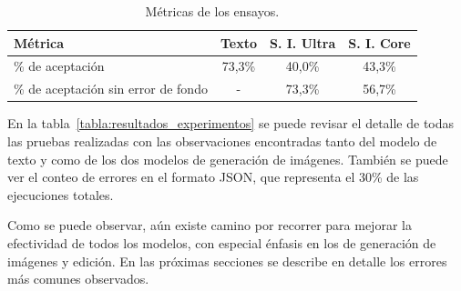 \begin{table}[ht]
	\centering
	\caption{Métricas de los ensayos.}
	\begin{tabular}{l c c c}    
		\toprule
		\textbf{Métrica} & \textbf{Texto} & \textbf{S. I. Ultra} & \textbf{S. I. Core} \\
		\midrule
		\% de aceptación & 73,3\% & 40,0\% & 43,3\% \\
            \% de aceptación sin error de fondo & - & 73,3\% & 56,7\% \\
		\bottomrule
		\hline
	\end{tabular}
	\label{tab:metricas_experimentos}
\end{table}

En la tabla~\ref{tabla:resultados_experimentos} se puede revisar el detalle de todas las pruebas realizadas con las observaciones encontradas tanto del modelo de texto y como de los dos modelos de generación de imágenes. También se puede ver el conteo de errores en el formato JSON, que representa el 30\% de las ejecuciones totales.

Como se puede observar, aún existe camino por recorrer para mejorar la efectividad de todos los modelos, con especial énfasis en los de generación de imágenes y edición. En las próximas secciones se describe en detalle los errores más comunes observados.

